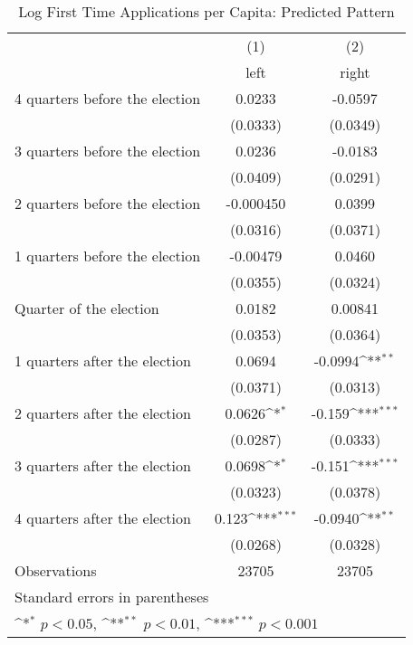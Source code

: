 \begin{table}[htbp]\centering
\def\sym#1{\ifmmode^{#1}\else\(^{#1}\)\fi}
\caption{Log First Time Applications per Capita: Predicted Pattern}
\begin{tabular}{l*{2}{c}}
\hline\hline
                    &\multicolumn{1}{c}{(1)}&\multicolumn{1}{c}{(2)}\\
                    &\multicolumn{1}{c}{left}&\multicolumn{1}{c}{right}\\
\hline
 4 quarters before the election&      0.0233         &     -0.0597         \\
                    &    (0.0333)         &    (0.0349)         \\
[1em]
 3 quarters before the election&      0.0236         &     -0.0183         \\
                    &    (0.0409)         &    (0.0291)         \\
[1em]
 2 quarters before the election&   -0.000450         &      0.0399         \\
                    &    (0.0316)         &    (0.0371)         \\
[1em]
 1 quarters before the election&    -0.00479         &      0.0460         \\
                    &    (0.0355)         &    (0.0324)         \\
[1em]
Quarter of the election&      0.0182         &     0.00841         \\
                    &    (0.0353)         &    (0.0364)         \\
[1em]
 1 quarters after the election&      0.0694         &     -0.0994\sym{**} \\
                    &    (0.0371)         &    (0.0313)         \\
[1em]
 2 quarters after the election&      0.0626\sym{*}  &      -0.159\sym{***}\\
                    &    (0.0287)         &    (0.0333)         \\
[1em]
 3 quarters after the election&      0.0698\sym{*}  &      -0.151\sym{***}\\
                    &    (0.0323)         &    (0.0378)         \\
[1em]
 4 quarters after the election&       0.123\sym{***}&     -0.0940\sym{**} \\
                    &    (0.0268)         &    (0.0328)         \\
\hline
Observations        &       23705         &       23705         \\
\hline\hline
\multicolumn{3}{l}{\footnotesize Standard errors in parentheses}\\
\multicolumn{3}{l}{\footnotesize \sym{*} \(p<0.05\), \sym{**} \(p<0.01\), \sym{***} \(p<0.001\)}\\
\end{tabular}
\end{table}
